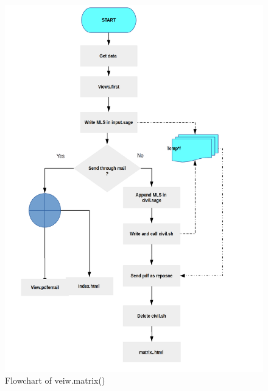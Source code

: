 \begin{figure}[H]
\centering \includegraphics[scale=0.27]{images/flowchartmatrix.png}
\caption{Flowchart of veiw.matrix()}
\label{fig:FD2}
\end{figure}
